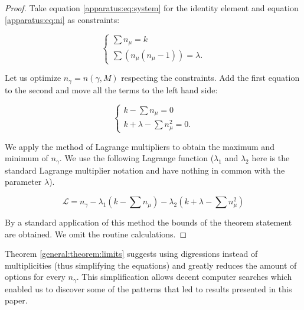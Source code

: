     \begin{proof}
        Take equation \eqref{apparatus:eq:system} for the identity element and equation \eqref{apparatus:eq:ni} as constraints:
        
        \begin{equation}
            \begin{cases}
                \sum {n_\mu} = k \\
                \sum (n_\mu(n_\mu-1)) = \lambda.
            \end{cases}
        \end{equation}
        
        Let us optimize $n_\gamma=n(\gamma,M)$ respecting the constraints. Add the first equation to the second and move all the terms to the left hand side:
        
        \begin{equation}
            \begin{cases}
                k - \sum {n_\mu} = 0 \\
                k + \lambda - \sum n_\mu^2 = 0.
            \end{cases}
        \end{equation}
        
        We apply the method of Lagrange multipliers to obtain the maximum and minimum of $n_\gamma$. 
We use the following Lagrange function ($\lambda_1$ and $\lambda_2$ here is the standard Lagrange multiplier notation and have nothing in common with the parameter $\lambda$).
        
        \begin{equation}
            \mathcal L = n_\gamma - \lambda_1 (k - \sum n_\mu) - \lambda_2 (k + \lambda - \sum n_\mu^2)
        \end{equation}
        
        By a standard application of this method the bounds of the theorem statement are obtained. We omit the routine calculations.
    \end{proof}

    Theorem \ref{general:theorem:limits}
suggests using digressions instead of multiplicities (thus simplifying the equations) and greatly reduces the amount of options for every $n_\gamma$. This simplification allows decent computer searches which enabled us to discover some of the patterns that led to results presented in this paper.
        
